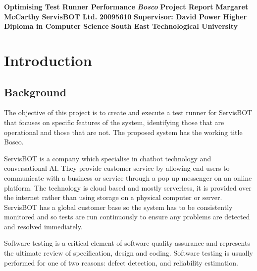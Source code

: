 \documentclass[12pt,a4paper,titlepage]{report}
\newcommand\AcademicTitle{Optimising Test Runner Performance}
\newcommand\CommercialTitle{Bosco}
\newcommand\Author{Margaret McCarthy}
\newcommand\StudentID{20095610}
\newcommand\Report{Project Report}
\newcommand\Stakeholder{ServisBOT Ltd.}
\newcommand\Course{Higher Diploma in Computer Science}
\newcommand\Reader{Supervisor: David Power}
\newcommand\University{South East Technological University}
\begin{document}

\thispagestyle{empty}
\begin{center}
 \mbox{}\vfill
 {\fontsize{17pt}{20pt}\selectfont \bfseries \AcademicTitle}
 \vfill
 {\fontsize{14pt}{20pt}\selectfont \bfseries\itshape \CommercialTitle}
 \vfill
 {\fontsize{12pt}{20pt}\selectfont \bfseries \Report}
 \vfill
 {\fontsize{14pt}{20pt}\selectfont \bfseries \Author}
 \vfill
 {\fontsize{14pt}{20pt}\selectfont \bfseries \Stakeholder}
 \vfill
 {\fontsize{14pt}{20pt}\selectfont \bfseries \StudentID}
 \vfill
 {\fontsize{14pt}{20pt}\selectfont \bfseries \Reader}
 \vfill
 {\fontsize{14pt}{20pt}\selectfont \bfseries \Course}
 \vfill
 {\fontsize{14pt}{20pt}\selectfont \bfseries \University}
 \vfill
\end{center}
\clearpage

\tableofcontents

\listoftables

\listoffigures

\clearpage
{}
\setcounter{page}{1}

\chapter{Introduction}

\section{Background}

The objective of this project is to create and execute a test runner for ServisBOT that focuses on specific features of the system, identifying those that are operational and those that are not. The proposed system has the working title Bosco.

ServisBOT is a company which specialise in chatbot technology and conversational AI. They provide customer service by allowing end users to communicate with a business or service through a pop up messenger on an online platform. 
The technology is cloud based and mostly serverless, it is provided over the internet rather than using storage on a physical computer or server. ServisBOT has a global customer base so the system has to be consistently monitored and so tests are run continuously to ensure any problems are detected and resolved immediately. 

Software testing is a critical element of software quality assurance and represents the ultimate review of specification, design and coding. Software testing is usually performed for one of two reasons: defect detection, and reliability estimation. \cite{Ahamed}
\end{document}
